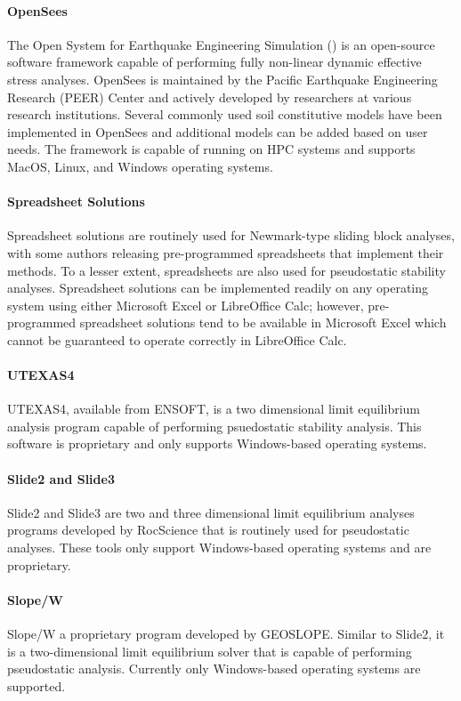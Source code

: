 \paragraph{OpenSees}
The Open System for Earthquake Engineering Simulation () is an open-source software framework capable of performing fully non-linear dynamic effective stress analyses. OpenSees is maintained by the Pacific Earthquake Engineering Research (PEER) Center and actively developed by researchers at various research institutions. Several commonly used soil constitutive models have been implemented in OpenSees and additional models can be added based on user needs. The framework is capable of running on HPC systems and supports MacOS, Linux, and Windows operating systems.

\paragraph{Spreadsheet Solutions}
Spreadsheet solutions are routinely used for Newmark-type sliding block analyses, with some authors releasing pre-programmed spreadsheets that implement their methods. To a lesser extent, spreadsheets are also used for pseudostatic stability analyses. Spreadsheet solutions can be implemented readily on any operating system using either Microsoft Excel or LibreOffice Calc; however, pre-programmed spreadsheet solutions tend to be available in Microsoft Excel which cannot be guaranteed to operate correctly in LibreOffice Calc.

\paragraph{UTEXAS4}
UTEXAS4, available from ENSOFT, is a two dimensional limit equilibrium analysis program capable of performing psuedostatic stability analysis. This software is proprietary and only supports Windows-based operating systems.

\paragraph{Slide2 and Slide3}
Slide2 and Slide3 are two and three dimensional limit equilibrium analyses programs developed by RocScience that is routinely used for pseudostatic analyses. These tools only support Windows-based operating systems and are proprietary.

\paragraph{Slope/W}
Slope/W a proprietary program developed by GEOSLOPE. Similar to Slide2, it is a two-dimensional limit equilibrium solver that is capable of performing pseudostatic analysis. Currently only Windows-based operating systems are supported.

